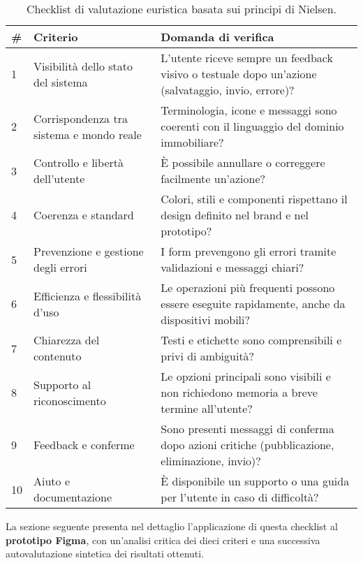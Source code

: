 \begin{table}[H]
\centering
\begin{tabular}{p{0.7cm} p{4cm} p{8cm}}
\hline
\textbf{\#} & \textbf{Criterio} & \textbf{Domanda di verifica} \\
\hline
1 & Visibilità dello stato del sistema & L’utente riceve sempre un feedback visivo o testuale dopo un’azione (salvataggio, invio, errore)? \\
2 & Corrispondenza tra sistema e mondo reale & Terminologia, icone e messaggi sono coerenti con il linguaggio del dominio immobiliare? \\
3 & Controllo e libertà dell’utente & È possibile annullare o correggere facilmente un’azione? \\
4 & Coerenza e standard & Colori, stili e componenti rispettano il design definito nel brand e nel prototipo? \\
5 & Prevenzione e gestione degli errori & I form prevengono gli errori tramite validazioni e messaggi chiari? \\
6 & Efficienza e flessibilità d’uso & Le operazioni più frequenti possono essere eseguite rapidamente, anche da dispositivi mobili? \\
7 & Chiarezza del contenuto & Testi e etichette sono comprensibili e privi di ambiguità? \\
8 & Supporto al riconoscimento & Le opzioni principali sono visibili e non richiedono memoria a breve termine all’utente? \\
9 & Feedback e conferme & Sono presenti messaggi di conferma dopo azioni critiche (pubblicazione, eliminazione, invio)? \\
10 & Aiuto e documentazione & È disponibile un supporto o una guida per l’utente in caso di difficoltà? \\
\hline
\end{tabular}
\caption{Checklist di valutazione euristica basata sui principi di Nielsen.}
\end{table}

\bigskip

La sezione seguente presenta nel dettaglio l’applicazione di questa checklist al \textbf{prototipo Figma}, con un’analisi critica dei dieci criteri e una successiva autovalutazione sintetica dei risultati ottenuti.




